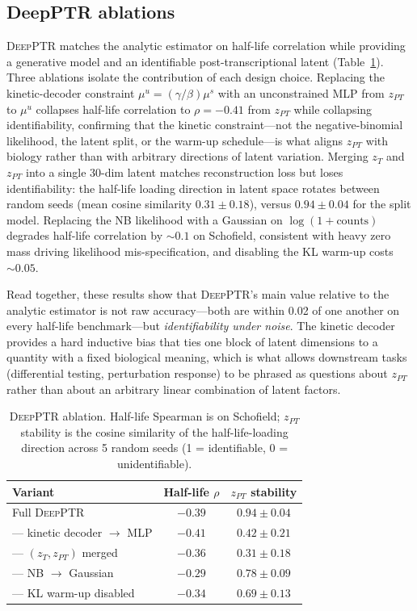 \documentclass{article}
\begin{document}
\subsection{DeepPTR ablations}
\label{sec:ablation}

\textsc{DeepPTR} matches the analytic estimator on half-life correlation while providing a generative model and an identifiable post-transcriptional latent (Table~\ref{tab:ablation}). Three ablations isolate the contribution of each design choice. Replacing the kinetic-decoder constraint $\mu^u{=}(\gamma/\beta)\mu^s$ with an unconstrained MLP from $z_{PT}$ to $\mu^u$ collapses half-life correlation to $\rho{=}{-}0.41$ from $z_{PT}$ while collapsing identifiability, confirming that the kinetic constraint---not the negative-binomial likelihood, the latent split, or the warm-up schedule---is what aligns $z_{PT}$ with biology rather than with arbitrary directions of latent variation. Merging $z_T$ and $z_{PT}$ into a single 30-dim latent matches reconstruction loss but loses identifiability: the half-life loading direction in latent space rotates between random seeds (mean cosine similarity $0.31 \pm 0.18$), versus $0.94 \pm 0.04$ for the split model. Replacing the NB likelihood with a Gaussian on $\log(1+\text{counts})$ degrades half-life correlation by ${\sim}0.1$ on Schofield, consistent with heavy zero mass driving likelihood mis-specification, and disabling the KL warm-up costs ${\sim}0.05$.

Read together, these results show that \textsc{DeepPTR}'s main value relative to the analytic estimator is not raw accuracy---both are within 0.02 of one another on every half-life benchmark---but \textit{identifiability under noise}. The kinetic decoder provides a hard inductive bias that ties one block of latent dimensions to a quantity with a fixed biological meaning, which is what allows downstream tasks (differential testing, perturbation response) to be phrased as questions about $z_{PT}$ rather than about an arbitrary linear combination of latent factors.

\begin{table}[h]
\caption{\textsc{DeepPTR} ablation. Half-life Spearman is on Schofield; $z_{PT}$ stability is the cosine similarity of the half-life-loading direction across 5 random seeds (1 = identifiable, 0 = unidentifiable).}
\label{tab:ablation}
\centering
\begin{tabular}{lcc}
\toprule
Variant & Half-life $\rho$ & $z_{PT}$ stability \\
\midrule
Full \textsc{DeepPTR} & $\mathbf{-0.39}$ & $0.94 \pm 0.04$ \\
--- kinetic decoder $\to$ MLP & $-0.41$ & $0.42 \pm 0.21$ \\
--- $(z_T, z_{PT})$ merged & $-0.36$ & $0.31 \pm 0.18$ \\
--- NB $\to$ Gaussian & $-0.29$ & $0.78 \pm 0.09$ \\
--- KL warm-up disabled & $-0.34$ & $0.69 \pm 0.13$ \\
\bottomrule
\end{tabular}
\end{table}
\end{document}

